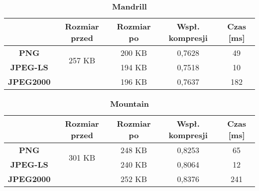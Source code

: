 \begin{table}[!h]
	\centering
	\caption{\textbf{Mandrill}}
	\label{my-label}
	\begin{tabular}{|c|c|c|c|c|}                                             
		\hline
		& \textbf{Rozmiar przed} & \textbf{Rozmiar po} & \textbf{Wspł. kompresji} & \textbf{Czas {[}ms{]}} \\ \hline 
		\textbf{PNG}      &          \multicolumn{1}{c|}{\multirow{2}{*}{257 KB}}             &     200 KB                &        0,7628                  &         49                    \\\cline{3-5}
		\textbf{JPEG-LS}  &                        &       194 KB             &        0,7518                 &           10               \\\cline{3-5}
		\textbf{JPEG2000} &                        &       196 KB              &          0,7637                &     182                 \\ \hline
	\end{tabular}
\end{table}

\begin{table}[!h]
	\centering
	\caption{\textbf{Mountain}}
	\label{my-label}
	\begin{tabular}{|c|c|c|c|c|}                                             
		\hline
		& \textbf{Rozmiar przed} & \textbf{Rozmiar po} & \textbf{Wspł. kompresji} & \textbf{Czas {[}ms{]}} \\ \hline 
		\textbf{PNG}      &          \multicolumn{1}{c|}{\multirow{2}{*}{301 KB}}             &       248 KB              &      0,8253                    &            65                 \\\cline{3-5}
		\textbf{JPEG-LS}  &                        &       240 KB              &          0,8064                &            12              \\\cline{3-5}
		\textbf{JPEG2000} &                        &       252 KB              &          0,8376                &       241               \\ \hline
	\end{tabular}
\end{table}

